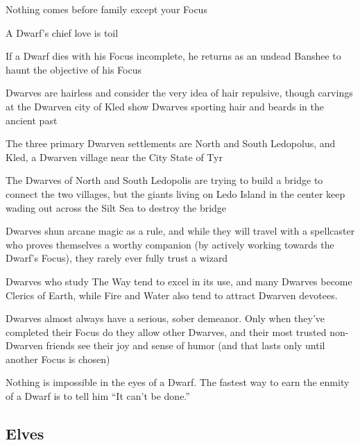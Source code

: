 \begin{multicols}{2}
\begin{description}
    \item Nothing comes before family except your Focus
    \item A Dwarf’s chief love is toil
    \item If a Dwarf dies with his Focus incomplete, he returns as an undead Banshee to haunt the objective of his Focus
    \item Dwarves are hairless and consider the very idea of hair repulsive, though carvings at the Dwarven city of Kled show Dwarves sporting hair and beards in the ancient past
    \item The three primary Dwarven settlements are North and South Ledopolus, and Kled, a Dwarven village near the City State of Tyr
    \item The Dwarves of North and South Ledopolis are trying to build a bridge to connect the two villages, but the giants living on Ledo Island in the center keep wading out across the Silt Sea to destroy the bridge
    \item Dwarves shun arcane magic as a rule, and while they will travel with a spellcaster who proves themselves a worthy companion (by actively working towards the Dwarf’s Focus), they rarely ever fully trust a wizard
    \item Dwarves who study The Way tend to excel in its use, and many Dwarves become Clerics of Earth, while Fire and Water also tend to attract Dwarven devotees.
    \item Dwarves almost always have a serious, sober demeanor. Only when they’ve completed their Focus do they allow other Dwarves, and their most trusted non-Dwarven friends see their joy and sense of humor (and that lasts only until another Focus is chosen)
    \item Nothing is impossible in the eyes of a Dwarf. The fastest way to earn the enmity of a Dwarf is to tell him “It can’t be done.”
\end{description}

\subsection{Elves}


\end{multicols}
